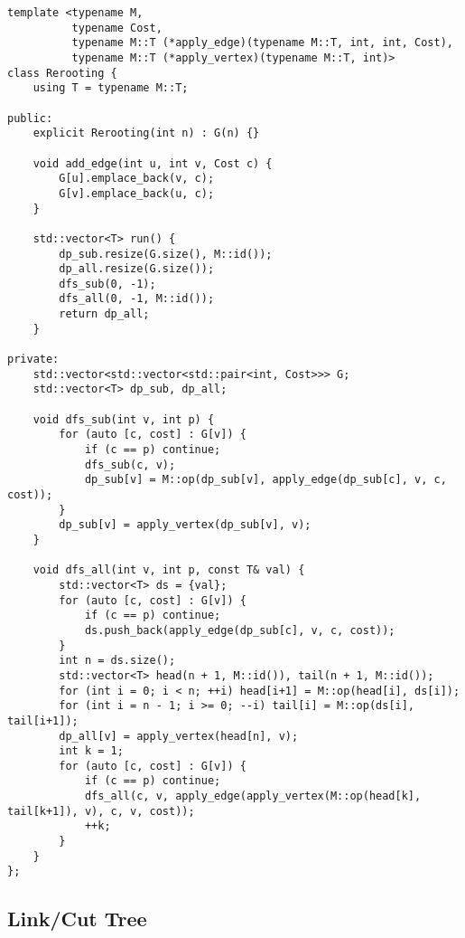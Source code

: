 \begin{lstlisting}
template <typename M,
          typename Cost,
          typename M::T (*apply_edge)(typename M::T, int, int, Cost),
          typename M::T (*apply_vertex)(typename M::T, int)>
class Rerooting {
    using T = typename M::T;

public:
    explicit Rerooting(int n) : G(n) {}

    void add_edge(int u, int v, Cost c) {
        G[u].emplace_back(v, c);
        G[v].emplace_back(u, c);
    }

    std::vector<T> run() {
        dp_sub.resize(G.size(), M::id());
        dp_all.resize(G.size());
        dfs_sub(0, -1);
        dfs_all(0, -1, M::id());
        return dp_all;
    }

private:
    std::vector<std::vector<std::pair<int, Cost>>> G;
    std::vector<T> dp_sub, dp_all;

    void dfs_sub(int v, int p) {
        for (auto [c, cost] : G[v]) {
            if (c == p) continue;
            dfs_sub(c, v);
            dp_sub[v] = M::op(dp_sub[v], apply_edge(dp_sub[c], v, c, cost));
        }
        dp_sub[v] = apply_vertex(dp_sub[v], v);
    }

    void dfs_all(int v, int p, const T& val) {
        std::vector<T> ds = {val};
        for (auto [c, cost] : G[v]) {
            if (c == p) continue;
            ds.push_back(apply_edge(dp_sub[c], v, c, cost));
        }
        int n = ds.size();
        std::vector<T> head(n + 1, M::id()), tail(n + 1, M::id());
        for (int i = 0; i < n; ++i) head[i+1] = M::op(head[i], ds[i]);
        for (int i = n - 1; i >= 0; --i) tail[i] = M::op(ds[i], tail[i+1]);
        dp_all[v] = apply_vertex(head[n], v);
        int k = 1;
        for (auto [c, cost] : G[v]) {
            if (c == p) continue;
            dfs_all(c, v, apply_edge(apply_vertex(M::op(head[k], tail[k+1]), v), c, v, cost));
            ++k;
        }
    }
};

\end{lstlisting}

\subsection{Link/Cut Tree}

